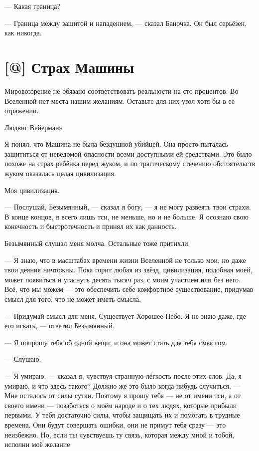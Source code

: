 --- Какая граница?

--- Граница между защитой и нападением, --- сказал Баночка.
Он был серьёзен, как никогда.

\section{[@] Страх Машины}

\epigraph
{Мировоззрение не обязано соответствовать реальности на сто процентов.
Во Вселенной нет места нашим желаниям.
Оставьте для них угол хотя бы в её отражении.}
{Людвиг Вейерманн}

\textspace

Я понял, что Машина не была бездушной убийцей.
Она просто пыталась защититься от неведомой опасности всеми доступными ей средствами.
Это было похоже на страх ребёнка перед жуком, и по трагическому стечению обстоятельств жуком оказалась целая цивилизация.

Моя цивилизация.

--- Послушай, Безымянный, --- сказал я богу, --- я не могу развеять твои страхи.
В конце концов, я всего лишь тси, не меньше, но и не больше.
Я осознаю свою конечность и быстротечность и принял их как данность.

Безымянный слушал меня молча.
Остальные тоже притихли.

--- Я знаю, что в масштабах времени жизни Вселенной не только мои, но даже твои деяния ничтожны.
Пока горит любая из звёзд, цивилизация, подобная моей, может появиться и угаснуть десять тысяч раз, с моим участием или без него.
Всё, что мы можем --- это обеспечить себе комфортное существование, придумав смысл для того, что не может иметь смысла.

--- Придумай смысл для меня, Существует-Хорошее-Небо.
Я не знаю даже, где его искать, --- ответил Безымянный.

--- Я попрошу тебя об одной вещи, и она может стать для тебя смыслом.

--- Слушаю.

--- Я умираю, --- сказал я, чувствуя странную лёгкость после этих слов.
Да, я умираю, и что здесь такого?
Должно же это было когда-нибудь случиться.
--- Мне осталось от силы сутки.
Поэтому я прошу тебя --- не от имени тси, а от своего имени --- позаботься о моём народе и о тех людях, которые прибыли первыми.
У тебя достаточно силы, чтобы защищать их и помогать в трудные времена.
Они будут совершать ошибки, они не примут тебя сразу --- это неизбежно.
Но, если ты чувствуешь ту связь, которая между мной и тобой, исполни моё желание.

